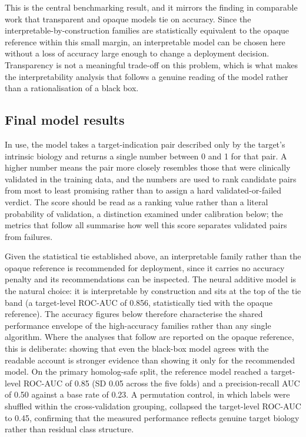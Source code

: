 \documentclass[11pt,twocolumn]{article}
\begin{document}
This is the central benchmarking result, and it mirrors the finding in comparable work that transparent and opaque models tie on accuracy. Since the interpretable-by-construction families are statistically equivalent to the opaque reference within this small margin, an interpretable model can be chosen here without a loss of accuracy large enough to change a deployment decision. Transparency is not a meaningful trade-off on this problem, which is what makes the interpretability analysis that follows a genuine reading of the model rather than a rationalisation of a black box.

\subsection{Final model results}

In use, the model takes a target-indication pair described only by the target's intrinsic biology and returns a single number between 0 and 1 for that pair. A higher number means the pair more closely resembles those that were clinically validated in the training data, and the numbers are used to rank candidate pairs from most to least promising rather than to assign a hard validated-or-failed verdict. The score should be read as a ranking value rather than a literal probability of validation, a distinction examined under calibration below; the metrics that follow all summarise how well this score separates validated pairs from failures.

Given the statistical tie established above, an interpretable family rather than the opaque reference is recommended for deployment, since it carries no accuracy penalty and its recommendations can be inspected. The neural additive model is the natural choice: it is interpretable by construction and sits at the top of the tie band (a target-level ROC-AUC of 0.856, statistically tied with the opaque reference). The accuracy figures below therefore characterise the shared performance envelope of the high-accuracy families rather than any single algorithm. Where the analyses that follow are reported on the opaque reference, this is deliberate: showing that even the black-box model agrees with the readable account is stronger evidence than showing it only for the recommended model. On the primary homolog-safe split, the reference model reached a target-level ROC-AUC of 0.85 (SD 0.05 across the five folds) and a precision-recall AUC of 0.50 against a base rate of 0.23. A permutation control, in which labels were shuffled within the cross-validation grouping, collapsed the target-level ROC-AUC to 0.45, confirming that the measured performance reflects genuine target biology rather than residual class structure.
\end{document}
